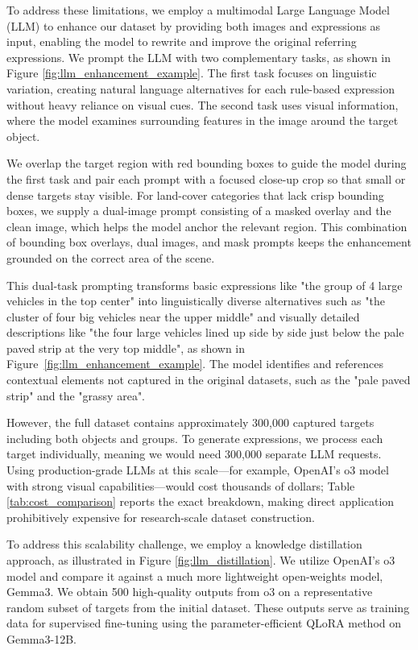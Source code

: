 \documentclass[journal]{IEEEtran}
\begin{document}
To address these limitations, we employ a multimodal Large Language Model (LLM) to enhance our dataset by providing both images and expressions as input, enabling the model to rewrite and improve the original referring expressions. We prompt the LLM with two complementary tasks, as shown in Figure \ref{fig:llm_enhancement_example}. The first task focuses on linguistic variation, creating natural language alternatives for each rule-based expression without heavy reliance on visual cues. The second task uses visual information, where the model examines surrounding features in the image around the target object.

We overlap the target region with red bounding boxes to guide the model during the first task and pair each prompt with a focused close-up crop so that small or dense targets stay visible. For land-cover categories that lack crisp bounding boxes, we supply a dual-image prompt consisting of a masked overlay and the clean image, which helps the model anchor the relevant region. This combination of bounding box overlays, dual images, and mask prompts keeps the enhancement grounded on the correct area of the scene.

This dual-task prompting transforms basic expressions like "the group of 4 large vehicles in the top center" into linguistically diverse alternatives such as "the cluster of four big vehicles near the upper middle" and visually detailed descriptions like "the four large vehicles lined up side by side just below the pale paved strip at the very top middle", as shown in Figure~\ref{fig:llm_enhancement_example}. The model identifies and references contextual elements not captured in the original datasets, such as the "pale paved strip" and the "grassy area".

However, the full dataset contains approximately 300,000 captured targets including both objects and groups. To generate expressions, we process each target individually, meaning we would need 300,000 separate LLM requests. Using production-grade LLMs at this scale—for example, OpenAI’s o3 model\cite{o3} with strong visual capabilities—would cost thousands of dollars; Table \ref{tab:cost_comparison} reports the exact breakdown, making direct application prohibitively expensive for research-scale dataset construction.

To address this scalability challenge, we employ a knowledge distillation~\cite{hinton2015distilling} approach, as illustrated in Figure \ref{fig:llm_distillation}. We utilize OpenAI’s o3 model\cite{o3} and compare it against a much more lightweight open-weights model, Gemma3\cite{gemma3}. We obtain 500 high-quality outputs from o3 on a representative random subset of targets from the initial dataset. These outputs serve as training data for supervised fine-tuning using the parameter-efficient QLoRA method\cite{qlora} on Gemma3-12B.
\end{document}

